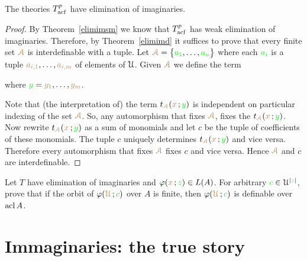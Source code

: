 \documentclass[creche.tex]{subfiles}
\begin{document}
\begin{theorem}\label{elimimacf} 
The theories $T^p_{\rm acf}$ have elimination of imaginaries.
\end{theorem}

\begin{proof}
By Theorem~\ref{elimimsm} we know that $T^p_{\rm acf}$ has weak elimination of imaginaries.
Therefore, by Theorem~\ref{elimimd} it suffices to prove that every finite set ${\color{brown}\EuScript A}$ is interdefinable with a tuple.
Let ${\color{brown}\EuScript A}=\big\{{\color{green} a_1},\dots,{\color{green} a_n}\big\}$ where each ${\color{green} a_i}$ is a tuple ${\color{brown} a_{i,1}},\dots,{\color{brown} a_{i,m}}$ of elements of $\EuScript U$.
Given ${\color{brown}\EuScript A}$ we define the term

\hfill where ${\color{green} y}={\color{brown} y_1},\dots,{\color{brown} y_m}$.


Note that (the interpretation of) the term $t_{\color{brown}\EuScript A}({\color{brown} x}\,;{\color{green} y})$ is independent on particular indexing of the set ${\color{brown}\EuScript A}$.
So, any automorphism that fixes ${\color{brown}\EuScript A}$, fixes the  $t_{\color{brown}\EuScript A}({\color{brown} x}\,;{\color{green} y})$.
Now rewrite $t_{\color{brown}\EuScript A}({\color{brown} x}\,;{\color{green} y})$ as a sum of monomials and let $c$ be the tuple of coefficients of these monomials.
The tuple $c$ uniquely determines $t_{\color{brown}\EuScript A}({\color{brown} x}\,;{\color{green} y})$ and vice versa.
Therefore every automorphism that fixes  ${\color{brown}\EuScript A}$ fixes  $c$ and vice versa.
Hence  ${\color{brown}\EuScript A}$ and  $c$ are interdefinable.
\end{proof}

\begin{exercise}
Let $T$ have elimination of imaginaries and $\varphi({\color{brown} x}\,;{\color{green} z})\in L(A)$.
For arbitrary ${\color{green} c}\in\EuScript U^{|{\color{green} z}|}$, prove that if the orbit of $\varphi({\color{brown}\EuScript U}\,; {\color{green} c})$ over $A$ is finite, then $\varphi({\color{brown}\EuScript U}\,; {\color{green} c})$ is definable over $\mathop{\rm acl} A$.\QED
\end{exercise}


\section{Immaginaries: the true story}\label{imaginaries_long}
\end{document}
